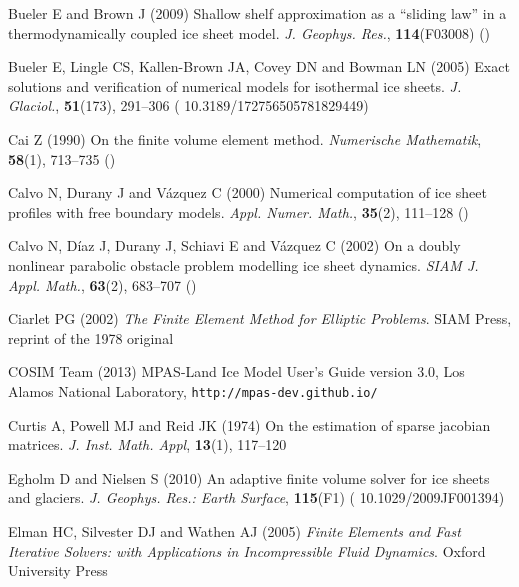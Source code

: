 \documentclass[review,letterpaper]{igs}
\begin{document}
\begin{thebibliography}{42}
Bueler E and Brown J (2009) Shallow shelf approximation as a ``sliding law'' in
  a thermodynamically coupled ice sheet model. \emph{J. Geophys. Res.},
  \textbf{114}({F}03008) ()

Bueler E, Lingle CS, Kallen-Brown JA, Covey DN and Bowman LN (2005) Exact
  solutions and verification of numerical models for isothermal ice sheets.
  \emph{J. Glaciol.}, \textbf{51}(173), 291--306 (\doi
  {10.3189/172756505781829449})

Cai Z (1990) On the finite volume element method. \emph{Numerische Mathematik},
  \textbf{58}(1), 713--735 ()

Calvo N, Durany J and V\'azquez C (2000) Numerical computation of ice sheet
  profiles with free boundary models. \emph{Appl. Numer. Math.},
  \textbf{35}(2), 111--128 ()

Calvo N, D\'iaz J, Durany J, Schiavi E and V\'azquez C (2002) On a doubly
  nonlinear parabolic obstacle problem modelling ice sheet dynamics. \emph{SIAM
  J. Appl. Math.}, \textbf{63}(2), 683--707 ()

Ciarlet PG (2002) \emph{The {F}inite {E}lement {M}ethod for {E}lliptic
  {P}roblems}. SIAM Press, reprint of the 1978 original

{COSIM Team} (2013) {MPAS-Land Ice Model User’s Guide} version 3.0, {L}os
  Alamos National Laboratory, \texttt{http://mpas-dev.github.io/}

Curtis A, Powell MJ and Reid JK (1974) On the estimation of sparse jacobian
  matrices. \emph{J. Inst. Math. Appl}, \textbf{13}(1), 117--120

Egholm D and Nielsen S (2010) An adaptive finite volume solver for ice sheets
  and glaciers. \emph{J. Geophys. Res.: Earth Surface}, \textbf{115}(F1) (\doi
  {10.1029/2009JF001394})

Elman HC, Silvester DJ and Wathen AJ (2005) \emph{Finite {E}lements and {F}ast
  {I}terative {S}olvers: with {A}pplications in {I}ncompressible {F}luid
  {D}ynamics}. Oxford University Press


\end{thebibliography}
\end{document}
